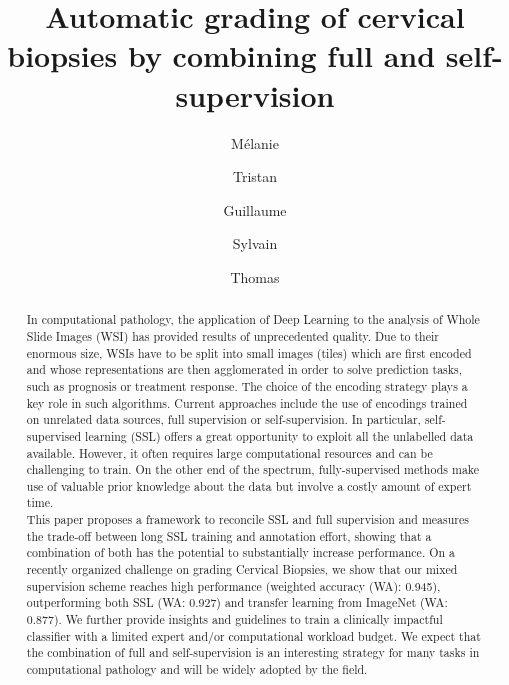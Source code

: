 \documentclass[times,twocolumn,final]{elsarticle}
\begin{document}

\begin{frontmatter}

\title{Automatic grading of cervical biopsies by combining full and self-supervision}%

\author[1,2]{M\'elanie }
\author[2,3,4]{Tristan }
\author[1]{Guillaume }
\author[1]{Sylvain }
\author[2,3,4]{Thomas }
\address[1]{KEEN EYE, 74 Rue du Faubourg Saint Antoine, Paris, 75012, France}
\address[2]{Centre for Computational Biology (CBIO), MINES ParisTech, PSL University, 60 Boulevard Saint Michel, 75272 Paris Cedex 06, France}
\address[3]{Institut Curie, 75248 Paris Cedex, France}
\address[4]{INSERM, U900, 75248 Paris Cedex, France}

\received{}
\finalform{}
\accepted{}
\availableonline{}
\communicated{}


\begin{abstract}
In computational pathology, the application of Deep Learning to the analysis of Whole Slide Images (WSI) has provided results of unprecedented quality. Due to their enormous size, WSIs have to be split into small images (tiles) which are first encoded and whose representations are then agglomerated in order to solve prediction tasks, such as prognosis or treatment response. The choice of the encoding strategy plays a key role in such algorithms. Current approaches include the use of encodings trained on unrelated data sources, full supervision or self-supervision. In particular, self-supervised learning (SSL) offers a great opportunity to exploit all the unlabelled data available. However, it often requires large computational resources and can be challenging to train. On the other end of the spectrum, fully-supervised methods make use of valuable prior knowledge about the data but involve a costly amount of expert time. \\
This paper proposes a framework to reconcile SSL and full supervision and measures the trade-off between long SSL training and annotation effort, showing that a combination of both has the potential to substantially increase performance. On a recently organized challenge on grading Cervical Biopsies, we show that our mixed supervision scheme reaches high performance (weighted accuracy (WA): 0.945), outperforming both SSL (WA: 0.927) and transfer learning from ImageNet (WA: 0.877). We further provide insights and guidelines to train a clinically impactful classifier with a limited expert and/or computational workload budget. We expect that the combination of full and self-supervision is an interesting strategy for many tasks in computational pathology and will be widely adopted by the field.
\end{abstract}


\end{frontmatter}
\end{document}
